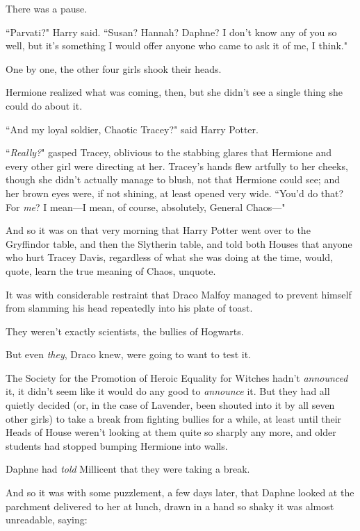 There was a pause.

``Parvati?" Harry said. ``Susan? Hannah? Daphne? I don't know any of you so well, but it's something I would offer anyone who came to ask it of me, I think."

One by one, the other four girls shook their heads.

Hermione realized what was coming, then, but she didn't see a single thing she could do about it.

``And my loyal soldier, Chaotic Tracey?" said Harry Potter.

``\emph{Really?}" gasped Tracey, oblivious to the stabbing glares that Hermione and every other girl were directing at her. Tracey's hands flew artfully to her cheeks, though she didn't actually manage to blush, not that Hermione could see; and her brown eyes were, if not shining, at least opened very wide. ``You'd do that? For \emph{me}? I mean—I mean, of course, absolutely, General Chaos—"

\later

And so it was on that very morning that Harry Potter went over to the Gryffindor table, and then the Slytherin table, and told both Houses that anyone who hurt Tracey Davis, regardless of what she was doing at the time, would, quote, learn the true meaning of Chaos, unquote.

It was with considerable restraint that Draco Malfoy managed to prevent himself from slamming his head repeatedly into his plate of toast.

They weren't exactly scientists, the bullies of Hogwarts.

But even \emph{they}, Draco knew, were going to want to test it.

\later

The Society for the Promotion of Heroic Equality for Witches hadn't \emph{announced} it, it didn't seem like it would do any good to \emph{announce} it. But they had all quietly decided (or, in the case of Lavender, been shouted into it by all seven other girls) to take a break from fighting bullies for a while, at least until their Heads of House weren't looking at them quite so sharply any more, and older students had stopped bumping Hermione into walls.

Daphne had \emph{told} Millicent that they were taking a break.

And so it was with some puzzlement, a few days later, that Daphne looked at the parchment delivered to her at lunch, drawn in a hand so shaky it was almost unreadable, saying:

